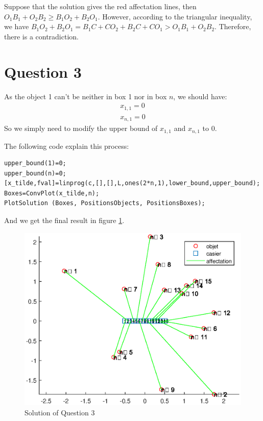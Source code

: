 \documentclass{CSArticle}[english]
\begin{document}
Suppose that the solution gives the red affectation lines, then $O_1B_1+O_2B_2\geqslant B_1O_2+B_2O_1$. However, according to the triangular inequality, we have $B_1O_2+B_2O_1=B_1C+CO_2+B_2C+CO_1 > O_1B_1+O_2B_2$. Therefore, there is a contradiction.



\section{Question 3}
\label{Q3}
As the object 1 can't be neither in box 1 nor in box $n$, we should have:
\begin{align}
    x_{1,1}=0\\
    x_{n,1}=0
\end{align}
So we simply need to modify the upper bound of $x_{1,1}$ and $x_{n,1}$ to 0.\par
The following code explain this process:
\begin{lstlisting}[style=MATLAB]
%% Q3
upper_bound(1)=0;
upper_bound(n)=0;
[x_tilde,fval]=linprog(c,[],[],L,ones(2*n,1),lower_bound,upper_bound);
Boxes=ConvPlot(x_tilde,n);
PlotSolution (Boxes, PositionsObjects, PositionsBoxes);
\end{lstlisting}
And we get the final result in figure \ref{fig:Q3}.
\begin{figure}[ht]
\centering
\includegraphics[scale=0.6]{figure/Q3.eps}
\caption{Solution of Question 3}
\label{fig:Q3}
\end{figure}
\end{document}
